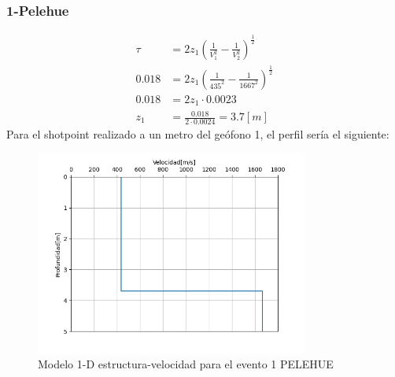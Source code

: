 \documentclass{article}
\theoremstyle{mytheoremstyle}
\theoremstyle{mytheoremstyle}
\theoremstyle{myproblemstyle}
\begin{document}
\subsubsection*{1-Pelehue}
\begin{align*}
	\tau&=2z_1\left(\frac{1}{V_1^2}-\frac{1}{V_2^2}\right)^\frac{1}{2}\\ 
	0.018&=2z_1\left(\frac{1}{435^2}-\frac{1}{1667^2}\right)^\frac{1}{2} \\ 
	0.018&=2z_1\cdot 0.0023\\
	z_1&=\frac{0.018}{2\cdot 0.0024}=3.7 [m]
\end{align*}
Para el shotpoint realizado a un metro del geófono 1, el perfil sería el siguiente:
\begin{figure}
	\includegraphics[width=0.8\textwidth,center]{vel-depth.png}
	\caption{Modelo 1-D estructura-velocidad para el evento 1 PELEHUE}
\end{figure}
\end{document}
